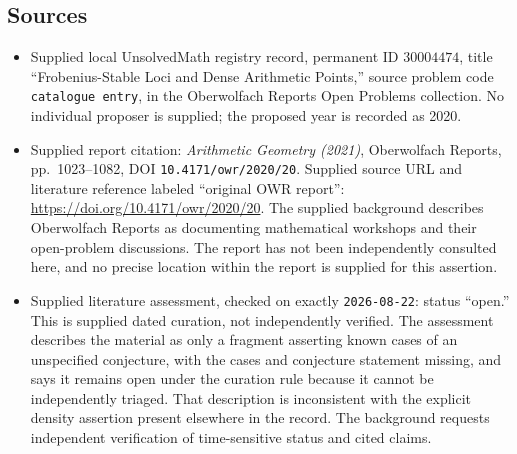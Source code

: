 \documentclass[11pt]{article}
\begin{document}
\subsection{Sources}
\begin{itemize}
\item Supplied local UnsolvedMath registry record, permanent ID \(30004474\), title ``Frobenius-Stable Loci and Dense Arithmetic Points,'' source problem code \texttt{catalogue entry}, in the Oberwolfach Reports Open Problems collection. No individual proposer is supplied; the proposed year is recorded as 2020.
\item Supplied report citation: \emph{Arithmetic Geometry (2021)}, Oberwolfach Reports, pp.~1023--1082, DOI \texttt{10.4171/owr/2020/20}. Supplied source URL and literature reference labeled ``original OWR report'': \url{https://doi.org/10.4171/owr/2020/20}. The supplied background describes Oberwolfach Reports as documenting mathematical workshops and their open-problem discussions. The report has not been independently consulted here, and no precise location within the report is supplied for this assertion.
\item Supplied literature assessment, checked on exactly \texttt{2026-08-22}: status ``open.'' This is supplied dated curation, not independently verified. The assessment describes the material as only a fragment asserting known cases of an unspecified conjecture, with the cases and conjecture statement missing, and says it remains open under the curation rule because it cannot be independently triaged. That description is inconsistent with the explicit density assertion present elsewhere in the record. The background requests independent verification of time-sensitive status and cited claims.
\end{itemize}
\end{document}
